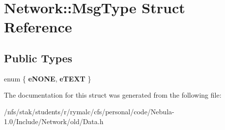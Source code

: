 \hypertarget{structNetwork_1_1MsgType}{
\section{Network::MsgType Struct Reference}
\label{structNetwork_1_1MsgType}
}
\subsection*{Public Types}
\begin{DoxyCompactItemize}
\item 
enum \{ {\bfseries eNONE}, 
{\bfseries eTEXT}
 \}
\end{DoxyCompactItemize}


The documentation for this struct was generated from the following file:\begin{DoxyCompactItemize}
\item 
/nfs/stak/students/r/rymalc/cfs/personal/code/Nebula-\/1.0/Include/Network/old/Data.h\end{DoxyCompactItemize}
